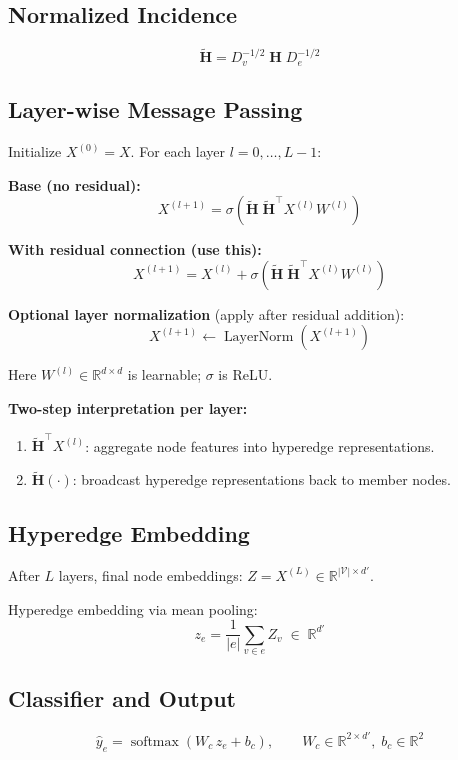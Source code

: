 \documentclass[11pt]{article}
\begin{document}
\subsection{Normalized Incidence}

\[
\tilde{\mathbf{H}} = D_v^{-1/2}\; \mathbf{H}\; D_e^{-1/2}
\]

\subsection{Layer-wise Message Passing}

Initialize $X^{(0)} = X$. For each layer $l = 0, \ldots, L-1$:

\textbf{Base (no residual):}
\[
X^{(l+1)} = \sigma\!\left(\tilde{\mathbf{H}}\;\tilde{\mathbf{H}}^\top X^{(l)} W^{(l)}\right)
\]

\textbf{With residual connection (use this):}
\[
X^{(l+1)} = X^{(l)} + \sigma\!\left(\tilde{\mathbf{H}}\;\tilde{\mathbf{H}}^\top X^{(l)} W^{(l)}\right)
\]

\textbf{Optional layer normalization} (apply after residual addition):
\[
X^{(l+1)} \leftarrow \operatorname{LayerNorm}\!\left(X^{(l+1)}\right)
\]

Here $W^{(l)} \in \mathbb{R}^{d \times d}$ is learnable; $\sigma$ is ReLU.

\textbf{Two-step interpretation per layer:}
\begin{enumerate}
    \item $\tilde{\mathbf{H}}^\top X^{(l)}$: aggregate node features into hyperedge representations.
    \item $\tilde{\mathbf{H}}(\cdot)$: broadcast hyperedge representations back to member nodes.
\end{enumerate}

\subsection{Hyperedge Embedding}

After $L$ layers, final node embeddings: $Z = X^{(L)} \in \mathbb{R}^{|\mathcal{V}| \times d'}$.

Hyperedge embedding via mean pooling:
\[
z_e = \frac{1}{|e|} \sum_{v \in e} Z_v \;\in\; \mathbb{R}^{d'}
\]

\subsection{Classifier and Output}

\[
\hat{y}_e = \operatorname{softmax}(W_c\, z_e + b_c), \qquad W_c \in \mathbb{R}^{2 \times d'},\; b_c \in \mathbb{R}^2
\]
\end{document}
